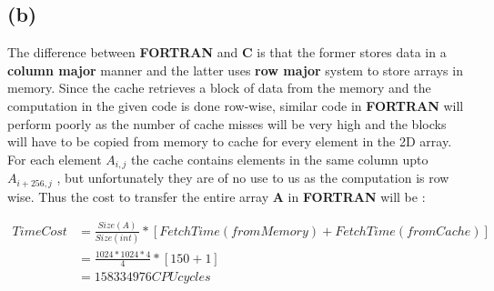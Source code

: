 \documentclass[a4paper,11pt]{article}
\theoremstyle{mytheor}
\begin{document}
\subsection{(b)}

The difference between \textbf{FORTRAN} and \textbf{C} is that the former stores data in a \textbf{column major} manner and the latter uses \textbf{row major} system to store arrays in memory. Since the cache retrieves a block of data from the memory and the computation in the given code is done row-wise, similar code in \textbf{FORTRAN} will perform poorly as the number of cache misses will be very high and the blocks will have to be copied from memory to cache for every element in the 2D array. For each element $A_{i,j}$ the cache contains elements in the same column upto $A_{i+256,j}$ , but unfortunately they are of no use to us as the computation is row wise. Thus the cost to transfer the entire array \textbf{A} in \textbf{FORTRAN} will be :

\begin{align*}
Time Cost &= \frac{Size(A)}{Size(int)}* [Fetch Time (from Memory)  + Fetch Time (from Cache)]\\
&= \frac{1024 * 1024 * 4}{4} * [150 + 1] \\
&=  158334976 CPU cycles
\end{align*}


 

\end{document}
